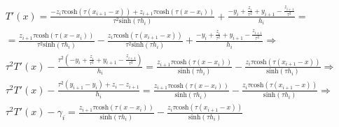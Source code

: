 \documentclass{article}
\begin{document}
  \begin{multline*}
    T'(x) =
           \frac{
             -z_i\tau\mathrm{cosh}(\tau(x_{i+1}-x)) +
             z_{i+1}\tau\textrm{cosh}(\tau(x-x_{i}))
           }
           {
             \tau^2\textrm{sinh}(\tau h_i)
           }
           +
           \frac {
             -y_i+\frac{z_i}{\tau^2} +
             y_{i+1}-\frac{z_{i+1}}{\tau^2}
           }
           {
             h_i
           }
           =
           \\
           =
           \frac{
             z_{i+1}\tau\textrm{cosh}(\tau(x-x_{i}))
           }
           {
             \tau^2\textrm{sinh}(\tau h_i)
           }
           -
           \frac{
             z_i\tau\mathrm{cosh}(\tau(x_{i+1}-x))
           }
           {
             \tau^2\textrm{sinh}(\tau h_i)
           }
           +
           \frac {
             -y_i+\frac{z_i}{\tau^2} +
             y_{i+1}-\frac{z_{i+1}}{\tau^2}
           }
           {
             h_i
           }
           \Rightarrow
           \\
           \tau^2T'(x)
           -
           \frac {
             \tau^2(-y_i+\frac{z_i}{\tau^2} +
             y_{i+1}-\frac{z_{i+1}}{\tau^2})
           }
           {
             h_i
           }
           =
           \frac{
             z_{i+1}\tau\textrm{cosh}(\tau(x-x_{i}))
           }
           {
             \textrm{sinh}(\tau h_i)
           }
           -
           \frac{
             z_i\tau\mathrm{cosh}(\tau(x_{i+1}-x))
           }
           {
             \textrm{sinh}(\tau h_i)
           }
           \Rightarrow
           \\
           \tau^2T'(x)
           -
           \frac {
             \tau^2(y_{i+1}-y_i)+z_i-z_{i+1}
           }
           {
             h_i
           }
           =
           \frac{
             z_{i+1}\tau\textrm{cosh}(\tau(x-x_{i}))
           }
           {
             \textrm{sinh}(\tau h_i)
           }
           -
           \frac{
             z_i\tau\mathrm{cosh}(\tau(x_{i+1}-x))
           }
           {
             \textrm{sinh}(\tau h_i)
           }
           \Rightarrow
           \\
           \tau^2T'(x)
           -
           \gamma_i
           =
           \frac{
             z_{i+1}\tau\textrm{cosh}(\tau(x-x_{i}))
           }
           {
             \textrm{sinh}(\tau h_i)
           }
           -
           \frac{
             z_i\tau\mathrm{cosh}(\tau(x_{i+1}-x))
           }
           {
             \textrm{sinh}(\tau h_i)
}
\end{multline*}
\end{document}
